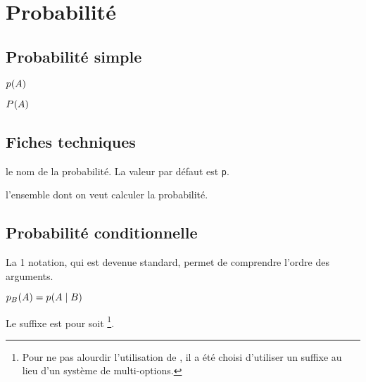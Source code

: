 \documentclass[12pt,a4paper]{article}
\begin{document}
\section{Probabilité}

\subsection{Probabilité \og simple \fg}

\newparaexample{}

\begin{latexex}
$\proba{A}$
\end{latexex}





\begin{latexex}
$\proba[P]{A}$
\end{latexex}




\subsection{Fiches techniques}


\IDoption{} le nom de la probabilité. La valeur par défaut est \verb+p+.

\IDarg{} l'ensemble dont on veut calculer la probabilité.




\subsection{Probabilité conditionnelle}


La 1\iere{} notation, qui est devenue standard, permet de comprendre l'ordre des arguments.
\begin{latexex}
 $\probacond {B}{A}
= \probacond*{B}{A}$
\end{latexex}





Le suffixe  est pour  soit 
\footnote{
	Pour ne pas alourdir l'utilisation de , il a été choisi d'utiliser un suffixe au lieu d'un système de multi-options.
}.
\end{document}
